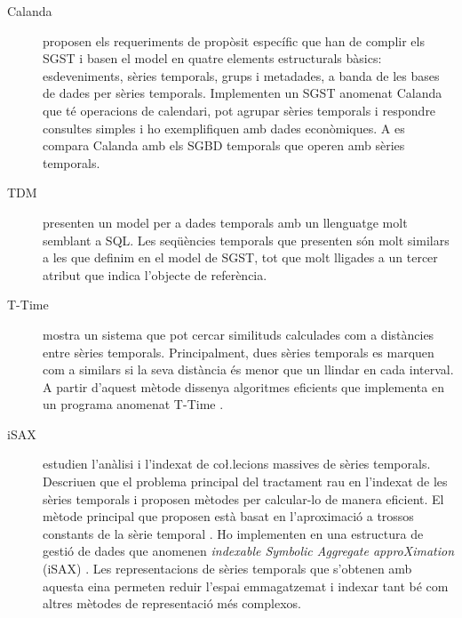 \begin{description}




\item[Calanda] \textcite{dreyer94} proposen els requeriments de propòsit específic que han de complir els SGST i basen el model en quatre elements estructurals bàsics: esdeveniments, sèries temporals, grups i metadades, a banda de les bases de dades per sèries temporals. Implementen un SGST anomenat Calanda \parencite{dreyer94b,dreyer95,dreyer95b} que té operacions de calendari, pot agrupar sèries temporals i respondre consultes simples i ho exemplifiquen amb dades econòmiques. A \cite{schmidt95} es compara Calanda amb els SGBD temporals que operen amb sèries temporals. 



\item[TDM] \textcite{segev87:sigmod} presenten un model per a dades temporals amb un llenguatge molt semblant a \gls{SQL}. Les seqüències temporals que presenten són molt similars a les que definim en el model de \gls{SGST}, tot que molt lligades a un tercer atribut que indica l'objecte de referència.





\item[T-Time] \textcite{assfalg08:thesis} mostra un sistema que pot cercar similituds calculades com a distàncies entre sèries temporals. Principalment, dues sèries temporals es marquen com a similars si la seva distància és menor que un llindar en cada interval. A partir d'aquest mètode dissenya algoritmes eficients que implementa en un programa anomenat T-Time \parencite{assfalg08:ttime}.


 
\item[iSAX] \textcite{keogh08:isax,keogh10:isax} estudien l'anàlisi i l'indexat de co\l.lecions massives de sèries temporals. Descriuen que el problema principal del tractament rau en l'indexat de les sèries temporals i proposen mètodes per calcular-lo de manera eficient. El mètode principal que proposen està basat en l'aproximació a trossos constants de la sèrie temporal \parencite{keogh00}.  Ho implementen en una estructura de gestió de dades que anomenen \emph{indexable Symbolic Aggregate approXimation} (iSAX) \parencite{isax}. Les representacions de sèries temporals que s'obtenen amb aquesta eina permeten reduir l'espai emmagatzemat i indexar tant bé com altres mètodes de representació més complexos.


\end{description}
